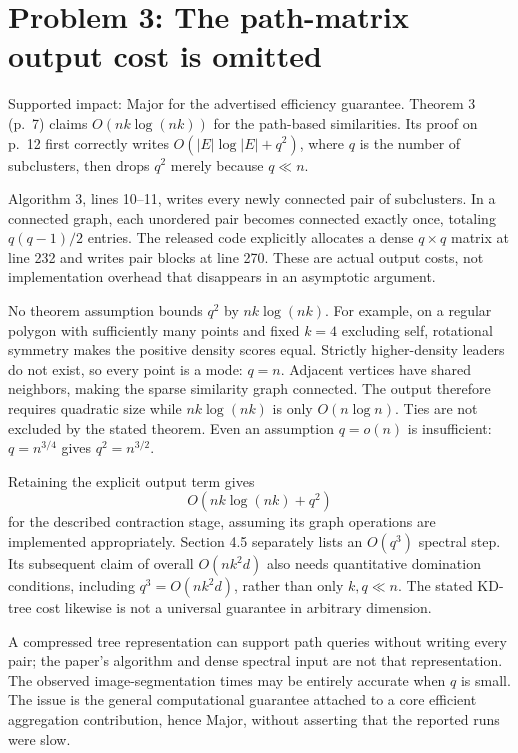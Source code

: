 \documentclass[10pt]{article}
\begin{document}
\section*{Problem 3: The path-matrix output cost is omitted}
Supported impact: Major for the advertised efficiency guarantee. Theorem 3 (p. 7) claims \(O(nk\log(nk))\) for the path-based similarities. Its proof on p. 12 first correctly writes \(O(|E|\log|E|+q^2)\), where \(q\) is the number of subclusters, then drops \(q^2\) merely because \(q\ll n\).\par
Algorithm 3, lines 10–11, writes every newly connected pair of subclusters. In a connected graph, each unordered pair becomes connected exactly once, totaling \(q(q-1)/2\) entries. The released code explicitly allocates a dense \(q\times q\) matrix at line 232 and writes pair blocks at line 270. These are actual output costs, not implementation overhead that disappears in an asymptotic argument.\par
No theorem assumption bounds \(q^2\) by \(nk\log(nk)\). For example, on a regular polygon with sufficiently many points and fixed \(k=4\) excluding self, rotational symmetry makes the positive density scores equal. Strictly higher-density leaders do not exist, so every point is a mode: \(q=n\). Adjacent vertices have shared neighbors, making the sparse similarity graph connected. The output therefore requires quadratic size while \(nk\log(nk)\) is only \(O(n\log n)\). Ties are not excluded by the stated theorem. Even an assumption \(q=o(n)\) is insufficient: \(q=n^{3/4}\) gives \(q^2=n^{3/2}\).\par
Retaining the explicit output term gives \[O(nk\log(nk)+q^2)\] for the described contraction stage, assuming its graph operations are implemented appropriately. Section 4.5 separately lists an \(O(q^3)\) spectral step. Its subsequent claim of overall \(O(nk^2d)\) also needs quantitative domination conditions, including \(q^3=O(nk^2d)\), rather than only \(k,q\ll n\). The stated KD-tree cost likewise is not a universal guarantee in arbitrary dimension.\par
A compressed tree representation can support path queries without writing every pair; the paper’s algorithm and dense spectral input are not that representation. The observed image-segmentation times may be entirely accurate when \(q\) is small. The issue is the general computational guarantee attached to a core efficient aggregation contribution, hence Major, without asserting that the reported runs were slow.\par
\end{document}
